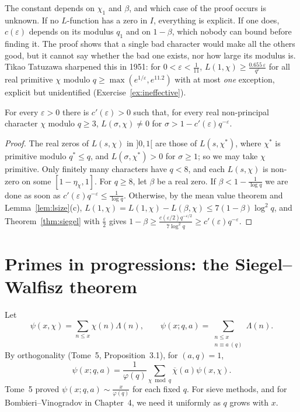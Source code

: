 The constant depends on $\chi_1$ and $\beta$, and which case of the proof occurs is unknown. If no $L$-function has a zero in $I$, everything is explicit. If one does, $c(\varepsilon)$ depends on its modulus $q_1$ and on $1-\beta$, which nobody can bound before finding it. The proof shows that a single bad character would make all the others good, but
it cannot say whether the bad one exists, nor how large its modulus is. Tikao Tatuzawa sharpened this in 1951: for $0<\varepsilon<\frac1{11}$, $L(1,\chi)\ge\frac{0.655\,\varepsilon}{q^\varepsilon}$ for all real primitive $\chi$ modulo $q\ge\max(e^{1/\varepsilon},e^{11.2})$ with at most \emph{one} exception, explicit but unidentified (Exercise~\ref{ex:ineffective}).

\begin{corollary}\label{cor:siegelzero}
For every $\varepsilon>0$ there is $c'(\varepsilon)>0$ such that, for every real non-principal character $\chi$ modulo $q\ge3$, $L(\sigma,\chi)\ne0$ for $\sigma>1-c'(\varepsilon)q^{-\varepsilon}$.
\end{corollary}
\begin{proof}
The real zeros of $L(s,\chi)$ in $]0,1[$ are those of $L(s,\chi^*)$, where $\chi^*$ is primitive modulo $q^*\le q$, and $L(\sigma,\chi^*)>0$ for $\sigma\ge1$; so we may take $\chi$ primitive. Only finitely many characters have $q<8$, and each $L(s,\chi)$ is non-zero on some $[1-\eta_\chi,1]$. For $q\ge8$, let $\beta$ be a real zero. If
$\beta<1-\frac1{\log q}$ we are done as soon as $c'(\varepsilon)q^{-\varepsilon}\le\frac1{\log q}$. Otherwise, by the mean value theorem and Lemma~\ref{lem:lsize}(c), $L(1,\chi)=L(1,\chi)-L(\beta,\chi)\le7(1-\beta)\log^2q$, and Theorem~\ref{thm:siegel} with $\frac\varepsilon2$ gives $1-\beta\ge\frac{c(\varepsilon/2)q^{-\varepsilon/2}}{7\log^2q}\ge c'(\varepsilon)q^{-\varepsilon}$.
\end{proof}

\section{Primes in progressions: the Siegel--Walfisz theorem}

Let
\[
\psi(x,\chi)=\sum_{n\le x}\chi(n)\Lambda(n),\qquad\psi(x;q,a)=\sum_{\substack{n\le x\\ n\equiv a\ (q)}}\Lambda(n).
\]
By orthogonality (Tome~5, Proposition~3.1), for $(a,q)=1$,
\begin{equation}\label{eq:orthpsi}
\psi(x;q,a)=\frac1{\varphi(q)}\sum_{\chi\bmod q}\overline\chi(a)\psi(x,\chi).
\end{equation}
Tome~5 proved $\psi(x;q,a)\sim\frac x{\varphi(q)}$ for each fixed $q$. For sieve methods, and for Bombieri--Vinogradov in Chapter~4, we need it uniformly as $q$ grows with $x$.


